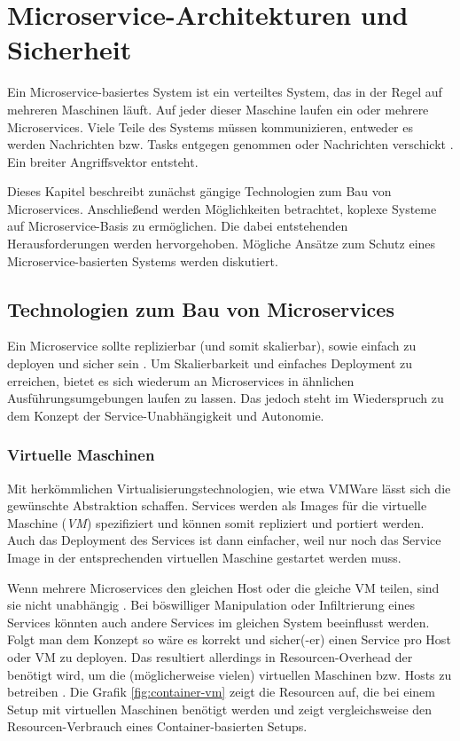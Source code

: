 \section{Microservice-Architekturen und Sicherheit}

Ein Microservice-basiertes System ist ein verteiltes System, das in der Regel auf mehreren Maschinen läuft. Auf jeder dieser Maschine laufen ein oder mehrere Microservices. Viele Teile des Systems müssen kommunizieren, entweder es werden Nachrichten bzw. Tasks entgegen genommen oder Nachrichten verschickt \cite{newman2015}. Ein breiter Angriffsvektor entsteht.

Dieses Kapitel beschreibt zunächst gängige Technologien zum Bau von Microservices. Anschließend werden Möglichkeiten betrachtet, koplexe Systeme auf Microservice-Basis zu ermöglichen. Die dabei entstehenden Herausforderungen werden hervorgehoben. Mögliche Ansätze zum Schutz eines Microservice-basierten Systems werden diskutiert.


\subsection{Technologien zum Bau von Microservices}

Ein Microservice sollte replizierbar (und somit skalierbar), sowie einfach zu deployen und sicher sein \cite{newman2015,microservicesIO}. Um Skalierbarkeit und einfaches Deployment zu erreichen, bietet es sich wiederum an Microservices in ähnlichen Ausführungsumgebungen laufen zu lassen. Das jedoch steht im Wiederspruch zu dem Konzept der Service-Unabhängigkeit und Autonomie. 

\subsubsection{Virtuelle Maschinen}
Mit herkömmlichen Virtualisierungstechnologien, wie etwa VMWare lässt sich die gewünschte Abstraktion schaffen. Services werden als Images für die virtuelle Maschine (\textit{VM}) spezifiziert und können somit repliziert und portiert werden. Auch das Deployment des Services ist dann einfacher, weil nur noch das Service Image in der entsprechenden virtuellen Maschine gestartet werden muss.

Wenn mehrere Microservices den gleichen Host oder die gleiche VM teilen, sind sie nicht unabhängig \cite{microservicesIO}. Bei böswilliger Manipulation oder Infiltrierung eines Services könnten auch andere Services im gleichen System beeinflusst werden. Folgt man dem Konzept so wäre es korrekt und sicher(-er) einen Service pro Host oder VM zu deployen. Das resultiert allerdings in Resourcen-Overhead der benötigt wird, um die (möglicherweise vielen) virtuellen Maschinen bzw. Hosts zu betreiben \cite{newman2015}. Die Grafik \ref{fig:container-vm} zeigt die Resourcen auf, die bei einem Setup mit virtuellen Maschinen benötigt werden und zeigt vergleichsweise den Resourcen-Verbrauch eines Container-basierten Setups.

